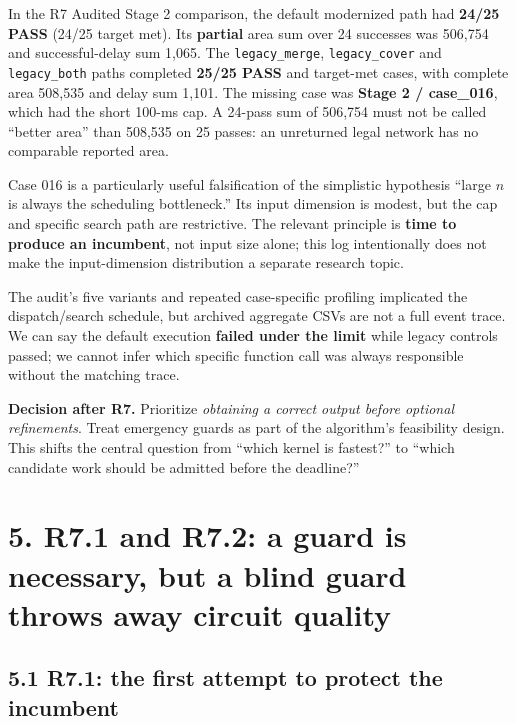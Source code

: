 \documentclass[a4paper,10pt]{article}
\theoremstyle{definition}
\theoremstyle{remark}
\begin{document}
In the R7 Audited Stage 2 comparison, the default modernized path had \textbf{24/25 PASS} (24/25 target met). Its \textbf{partial} area sum over 24 successes was 506,754 and successful-delay sum 1,065. The \texttt{legacy\_merge}, \texttt{legacy\_cover} and \texttt{legacy\_both} paths completed \textbf{25/25 PASS} and target-met cases, with complete area 508,535 and delay sum 1,101. The missing case was \textbf{Stage 2 / case\_016}, which had the short 100-ms cap. A 24-pass sum of 506,754 must not be called ``better area'' than 508,535 on 25 passes: an unreturned legal network has no comparable reported area.

Case 016 is a particularly useful falsification of the simplistic hypothesis ``large \(n\) is always the scheduling bottleneck.'' Its input dimension is modest, but the cap and specific search path are restrictive. The relevant principle is \textbf{time to produce an incumbent}, not input size alone; this log intentionally does not make the input-dimension distribution a separate research topic.

The audit's five variants and repeated case-specific profiling implicated the dispatch/search schedule, but archived aggregate CSVs are not a full event trace. We can say the default execution \textbf{failed under the limit} while legacy controls passed; we cannot infer which specific function call was always responsible without the matching trace.

\begin{tcolorbox}[colback=ResearchBlue!6!white,colframe=ResearchSlate!55!white,boxrule=0.65pt,arc=1mm,breakable]
\textbf{Decision after R7.} Prioritize \emph{obtaining a correct output before optional refinements}. Treat emergency guards as part of the algorithm's feasibility design. This shifts the central question from ``which kernel is fastest?'' to ``which candidate work should be admitted before the deadline?''
\end{tcolorbox}

\section{5. R7.1 and R7.2: a guard is necessary, but a blind guard throws away circuit quality}\label{r7.1-and-r7.2-a-guard-is-necessary-but-a-blind-guard-throws-away-circuit-quality}

\subsection{5.1 R7.1: the first attempt to protect the incumbent}\label{r7.1-the-first-attempt-to-protect-the-incumbent}
\end{document}
